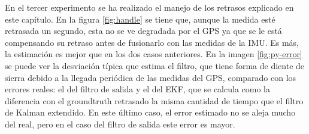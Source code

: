 En el tercer experimento se ha realizado el manejo de los retrasos explicado en este capítulo. En la figura \ref{fig:handle} se tiene que, aunque la medida esté retrasada un segundo, esta no se ve degradada por el GPS ya que se le está compensando su retraso antes de fusionarlo con las medidas de la IMU. Es más, la estimación es mejor que en los dos casos anteriores. En la imagen \ref{fig:py-error} se puede ver la desviación típica que estima el filtro, que tiene forma de diente de sierra debido a la llegada periódica de las medidas del GPS, comparado con los errores reales: el del filtro de salida y el del EKF, que se calcula como la diferencia con el groundtruth retrasado la misma cantidad de tiempo que el filtro de Kalman extendido. En este último caso, el error estimado no se aleja mucho del real, pero en el caso del filtro de salida este error es mayor. 

